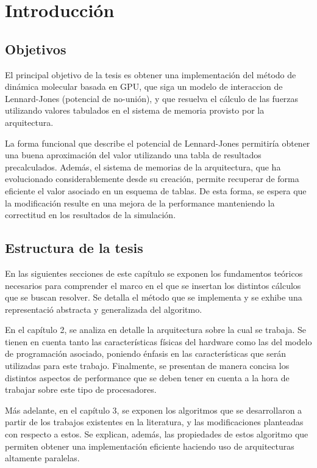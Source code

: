 \chapter{Introducción}
\section{Objetivos}



El principal objetivo de la tesis es obtener una implementación del método de dinámica molecular basada en GPU, que siga un modelo de interaccion de Lennard-Jones (potencial de no-unión), y que resuelva el cálculo de las fuerzas utilizando valores tabulados en el sistema de memoria provisto por la arquitectura. 

La forma funcional que describe el potencial de Lennard-Jones permitiría obtener una buena aproximación del valor utilizando una tabla de resultados precalculados. 
Además, el sistema de memorias de la arquitectura, que ha evolucionado considerablemente desde su creación, permite recuperar de forma eficiente el valor asociado en un esquema de tablas. 
De esta forma, se espera que la modificación resulte en una mejora de la performance manteniendo la correctitud en los resultados de la simulación. 



\section{Estructura de la tesis}

En las siguientes secciones de este capítulo se exponen los fundamentos teóricos necesarios para comprender el marco en el que se insertan los distintos cálculos que se buscan resolver. Se detalla el método que se implementa y se exhibe una representaci\'o abstracta y generalizada del algoritmo.

En el capítulo 2, se analiza en detalle la arquitectura sobre la cual se trabaja. Se tienen en cuenta tanto las características físicas del hardware como las del modelo de programación asociado, poniendo \'enfasis en las caracter\'isticas que ser\'an utilizadas para este trabajo. Finalmente, se presentan de manera concisa los distintos aspectos de performance que se deben tener en cuenta a la hora de trabajar sobre este tipo de procesadores.

Más adelante, en el capítulo 3, se exponen los algoritmos que se desarrollaron a partir de los trabajos existentes en la literatura, y las modificaciones planteadas con respecto a estos. Se explican, adem\'as, las propiedades de estos algoritmo que permiten obtener una implementación eficiente haciendo uso de arquitecturas altamente paralelas.

